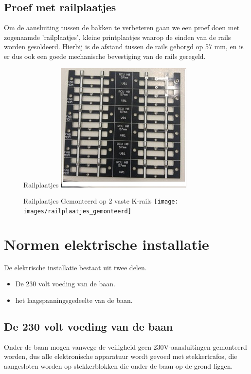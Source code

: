 \documentclass[12pt,a4paper]{report}
\begin{document}
\section{Proef met railplaatjes}

Om de aansluiting tussen de bakken te verbeteren gaan we een proef doen met zogenaamde 'railplaatjes', kleine printplaatjes waarop de einden van de rails worden gesoldeerd. Hierbij is de afstand tussen de rails geborgd op 57 mm, en is er dus ook een goede mechanische bevestiging van de rails geregeld.

\begin{figure}[!ht]
  \captionbox
  {Railplaatjes\label{railplaatjes}}
  {\includegraphics[scale=0.4]{images/railplaatjes}}
\end{figure}

\begin{figure}[!ht]
  \captionbox
  {Railplaatjes Gemonteerd op 2 vaste K-rails\label{railplaatjes_gemonteerd}}
  {\texttt{[image: images/railplaatjes\_gemonteerd]}}
\end{figure}

\chapter{Normen elektrische installatie}
\label{ch:elektra}

De elektrische installatie bestaat uit twee delen.

\begin{itemize}
\item De 230 volt voeding van de baan.
\item het laagspanningsgedeelte van de baan.
\end{itemize}

\section{De 230 volt voeding van de baan}
Onder de baan mogen vanwege de veiligheid geen 230V-aansluitingen gemonteerd worden, dus alle elektronische apparatuur wordt gevoed met stekkertrafos, die aangesloten worden op stekkerblokken die onder de baan op de grond liggen.
\end{document}
